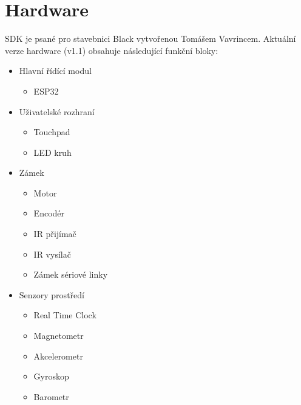 \newpage
\section{Hardware}
SDK je psané pro stavebnici Black vytvořenou Tomášem Vavrincem.
Aktuální verze hardware (v1.1) obsahuje následující funkční bloky:

\begin{itemize}[noitemsep]
    \item Hlavní řídící modul
        \begin{itemize}[noitemsep]
            \item ESP32
        \end{itemize}
    \item Uživatelské rozhraní
        \begin{itemize}[noitemsep]
            \item Touchpad
            \item LED kruh
        \end{itemize}
    \item Zámek
        \begin{itemize}[noitemsep]
            \item Motor
            \item Encodér
            \item IR přijímač
            \item IR vysílač
            \item Zámek sériové linky
        \end{itemize}
    \item Senzory prostředí
        \begin{itemize}[noitemsep]
            \item Real Time Clock
            \item Magnetometr
            \item Akcelerometr
            \item Gyroskop
            \item Barometr
        \end{itemize}
\end{itemize}